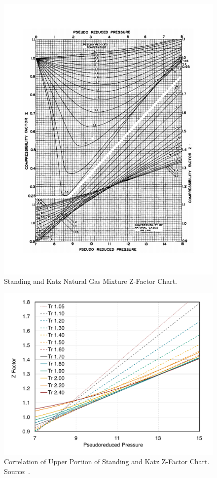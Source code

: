 \documentclass[11pt]{report}
\begin{document}
\begin{figure}[ht]
\includegraphics[width=0.70\columnwidth]{images/StandingKatzOriginal.pdf}
\caption{Standing and Katz \cite{StandingKatz1942} Natural Gas Mixture Z-Factor Chart.}
\label{fig:StandingKatzZFactors}
\end{figure}

\begin{figure}[ht]
\includegraphics[width=0.70\columnwidth]{images/StandingKatzCorrelationUpper.pdf}
\caption{Correlation of Upper Portion of Standing and Katz Z-Factor Chart. Source: \cite{Standing1977}.}
\label{fig:SBBCorrelationUpper}
\end{figure}
\end{document}
